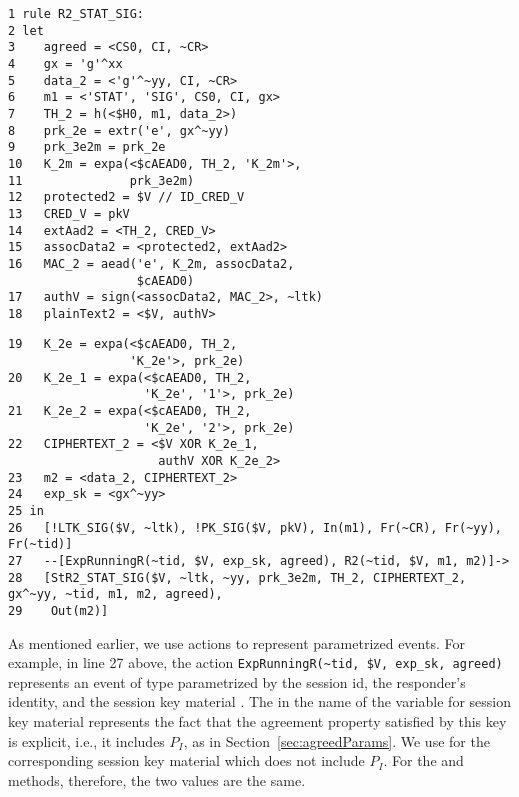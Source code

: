 \begin{minipage}{\textwidth}
\begin{scriptsize}
\begin{verbatim}
1 rule R2_STAT_SIG:
2 let
3    agreed = <CS0, CI, ~CR>
4    gx = 'g'^xx
5    data_2 = <'g'^~yy, CI, ~CR>
6    m1 = <'STAT', 'SIG', CS0, CI, gx>
7    TH_2 = h(<$H0, m1, data_2>)
8    prk_2e = extr('e', gx^~yy)
9    prk_3e2m = prk_2e
10   K_2m = expa(<$cAEAD0, TH_2, 'K_2m'>,
11               prk_3e2m)
12   protected2 = $V // ID_CRED_V
13   CRED_V = pkV
14   extAad2 = <TH_2, CRED_V>
15   assocData2 = <protected2, extAad2>
16   MAC_2 = aead('e', K_2m, assocData2,
                  $cAEAD0)
17   authV = sign(<assocData2, MAC_2>, ~ltk)
18   plainText2 = <$V, authV>
\end{verbatim}
\end{scriptsize}
\end{minipage}
\begin{minipage}{0.02\textwidth}
\end{minipage}
\begin{minipage}{0.48\textwidth}
\begin{scriptsize}
\begin{verbatim}
19   K_2e = expa(<$cAEAD0, TH_2,
                 'K_2e'>, prk_2e)
20   K_2e_1 = expa(<$cAEAD0, TH_2,
                   'K_2e', '1'>, prk_2e)
21   K_2e_2 = expa(<$cAEAD0, TH_2,
                   'K_2e', '2'>, prk_2e)
22   CIPHERTEXT_2 = <$V XOR K_2e_1,
                     authV XOR K_2e_2>
23   m2 = <data_2, CIPHERTEXT_2>
24   exp_sk = <gx^~yy>
25 in
26   [!LTK_SIG($V, ~ltk), !PK_SIG($V, pkV), In(m1), Fr(~CR), Fr(~yy), Fr(~tid)]
27   --[ExpRunningR(~tid, $V, exp_sk, agreed), R2(~tid, $V, m1, m2)]->
28   [StR2_STAT_SIG($V, ~ltk, ~yy, prk_3e2m, TH_2, CIPHERTEXT_2, gx^~yy, ~tid, m1, m2, agreed),
29    Out(m2)]
\end{verbatim}
\end{scriptsize}
\end{minipage}
\vspace{5mm}

As mentioned earlier, we use actions to represent parametrized events.
%
For example, in line 27 above, the action
\verb|ExpRunningR(~tid, $V, exp_sk, agreed)| represents an event of type
\mRStart{} parametrized by the session id, the responder's identity, and the
session key material .
%
The  in the name of the variable for session key material represents
the fact that the agreement property satisfied by this key is explicit, i.e.,
it includes $P_{I}$, as in Section~\ref{sec:agreedParams}.
%
We use  for the corresponding session key material which does 
not
include $P_{I}$.
%
For the \mSigSig{} and \mSigStat{} methods, therefore, the two values are the 
same.
%

